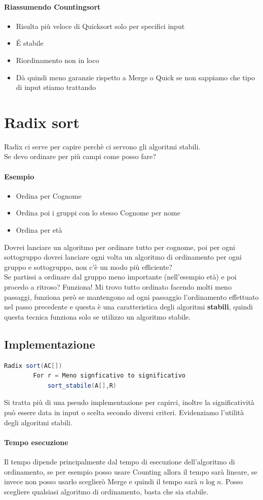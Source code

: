 \paragraph*{Riassumendo Countingsort}
\begin{itemize}
    \item Risulta più veloce di Quicksort solo per specifici input
    \item \'E stabile
    \item Riordinamento non in loco
    \item Dà quindi meno garanzie rispetto a Merge o Quick se non sappiamo che tipo di input stiamo trattando
\end{itemize}

\section{Radix sort}
Radix ci serve per capire perchè ci servono gli algoritmi stabili.\\
Se devo ordinare per più campi come posso fare?
\paragraph*{Esempio}
\begin{itemize}
    \item Ordina per Cognome
    \item Ordina poi i gruppi con lo stesso Cognome per nome
    \item Ordina per età
\end{itemize}
Dovrei lanciare un algoritmo per ordinare tutto per cognome, poi per ogni
sottogruppo dovrei lanciare ogni volta un algoritmo di ordinamento per ogni gruppo e sottogruppo,
non c'è un modo più efficiente?\\
Se partissi a ordinare dal gruppo meno importante (nell'esempio età) e poi procedo a ritroso?
Funziona! Mi trovo tutto ordinato facendo molti meno passaggi, funziona però se mantengono
ad ogni passaggio l'ordinamento effettuato nel passo precedente e questa è una caratteristica
degli algoritmi \textbf{stabili}, quindi questa tecnica funziona solo se utilizzo un algoritmo stabile.
\subsection{Implementazione}
\begin{lstlisting}[language=Java]
    Radix sort(AC[])
        For r = Meno signficativo to significativo
            sort_stabile(A[],R)
\end{lstlisting}
Si tratta più di una pseudo implementazione per capirci, inoltre la significatività può
essere data in input o scelta secondo diversi criteri. Evidenziamo l'utilità degli algoritmi
stabili.
\paragraph*{Tempo esecuzione} Il tempo dipende principalmente dal tempo di esecuzione dell'algoritmo
di ordinamento, se per esempio posso usare Counting allora il tempo sarà lineare, se invece non posso
usarlo sceglierò Merge e quindi il tempo sarà $n \log n$. Posso scegliere qualsiasi algoritmo
di ordinamento, basta che sia stabile. 